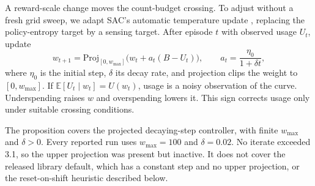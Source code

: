 A reward-scale change moves the count-budget crossing. To adjust without a fresh grid sweep, we adapt SAC's automatic temperature update \citep{haarnoja2018sac}, replacing the policy-entropy target by a sensing target. After episode $t$ with observed usage $U_t$, update
\begin{equation}
\label{eq:dual_update}
w_{t+1}=\mathrm{Proj}_{[0,w_{\max}]}\big(w_t+a_t(B-U_t)\big),\qquad a_t=\frac{\eta_0}{1+\delta t},
\end{equation}
where $\eta_0$ is the initial step, $\delta$ its decay rate, and projection clips the weight to $[0,w_{\max}]$. If $\mathbb E[U_t\mid w_t]=U(w_t)$, usage is a noisy observation of the curve. Underspending raises $w$ and overspending lowers it. This sign corrects usage only under suitable crossing conditions.

The proposition covers the projected decaying-step controller, with finite $w_{\max}$ and $\delta>0$. Every reported run uses $w_{\max}=100$ and $\delta=0.02$. No iterate exceeded 3.1, so the upper projection was present but inactive. It does not cover the released library default, which has a constant step and no upper projection, or the reset-on-shift heuristic described below.

